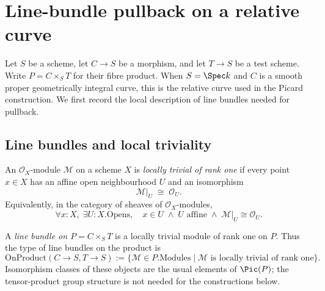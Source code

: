 \chapter{Line-bundle pullback on a relative curve}
\label{chap:Picard_LineBundlePullback}

Let $S$ be a scheme, let $C \to S$ be a morphism, and let $T \to S$ be a
test scheme.  Write $P=C\times_S T$ for their fibre product.  When $S=\Spec k$
and $C$ is a smooth proper geometrically integral curve, this is the relative
curve used in the Picard construction.  We first record the local description
of line bundles needed for pullback.

\section{Line bundles and local triviality}
\label{sec:lbp_line_bundle}

\begin{definition}\leanok
  \label{def:IsLocallyTrivial}
  An $\mathcal O_X$-module $\mathcal M$ on a scheme $X$ is \emph{locally
  trivial of rank one} if every point $x\in X$ has an affine open
  neighbourhood $U$ and an isomorphism
  \[
    \mathcal M|_U \;\cong\; \mathcal O_U.
  \]
  Equivalently, in the category of sheaves of $\mathcal O_X$-modules,
  \[
    \forall x:X,\;\exists U:X.\mathrm{Opens},\quad
    x\in U\;\wedge\;U\text{ affine}\;\wedge\;
    \mathcal M|_U\cong\mathcal O_U.
  \]
\end{definition}

\begin{definition}\leanok
  \label{def:line_bundle_on_product}
  A \emph{line bundle on $P=C\times_S T$} is a locally trivial module of rank
  one on $P$.  Thus the type of line bundles on the product is
  \[
    \mathrm{OnProduct}(C\to S,T\to S)
    :=\{\mathcal M\in P.\mathrm{Modules}\mid
          \mathcal M\text{ is locally trivial of rank one}\}.
  \]
  Isomorphism classes of these objects are the usual elements of
  $\Pic(P)$; the tensor-product group structure is not needed for the
  constructions below.
\end{definition}

